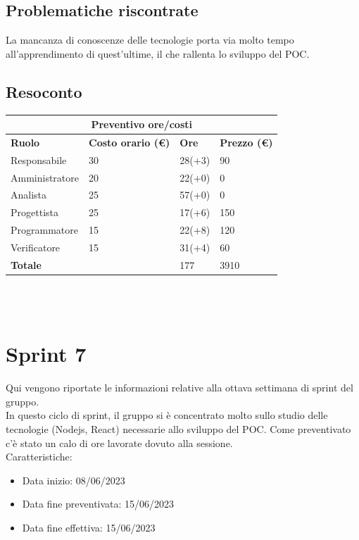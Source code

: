 \documentclass[12pt]{article}
\begin{document}
\subsection{Problematiche riscontrate}
La mancanza di conoscenze delle tecnologie porta via molto tempo all'apprendimento di quest'ultime, il che rallenta lo sviluppo del POC.
\subsection{Resoconto}
\begin{center}
    \begin{tabularx}{\textwidth}{|X|X|X|X|}
        \hline
        \multicolumn{4}{|c|}{\textbf{Preventivo ore/costi}}\\
        \hline
        \hline
        \textbf{Ruolo} & \textbf{Costo orario (\euro)} & \textbf{Ore} & \textbf{Prezzo (\euro)}\\
        \hline
        Responsabile    & 30 & 28(+3)  & 90\\
        \hline
        Amministratore  & 20 & 22(+0)  & 0\\
        \hline
        Analista        & 25 & 57(+0)  & 0\\
        \hline
        Progettista     & 25 & 17(+6)  & 150\\
        \hline
        Programmatore   & 15 & 22(+8)  & 120\\
        \hline
        Verificatore    & 15 & 31(+4)  & 60\\
        \hline
        \hline
        \textbf{Totale} &    & 177 &  3910 \\
        \hline
    \end{tabularx}\\[8pt]
    \mbox{}\\
\end{center}

\section{Sprint 7}
Qui vengono riportate le informazioni relative alla ottava settimana di sprint del gruppo. \\
In questo ciclo di sprint, il gruppo si è concentrato molto sullo studio delle tecnologie (Nodejs, React) necessarie allo sviluppo del POC. Come preventivato c'è stato un calo di ore lavorate dovuto alla sessione.\\


Caratteristiche:
\begin{itemize}
    \item Data inizio: 08/06/2023
    \item Data fine preventivata: 15/06/2023
    \item Data fine effettiva: 15/06/2023
\end{itemize}
\end{document}
